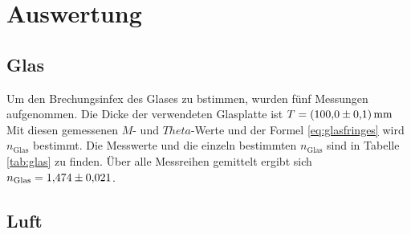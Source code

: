 \section{Auswertung}
\label{sec:Auswertung}
\subsection{Glas}
Um den Brechungsinfex des Glases zu bstimmen, wurden fünf Messungen aufgenommen. Die Dicke der verwendeten Glasplatte ist $T=\SI{100\pm 0.1}{\milli\meter}$
Mit diesen gemessenen $M$- und $Theta$-Werte und der Formel \eqref{eq:glasfringes} wird $n_\text{Glas}$ bestimmt. Die Messwerte und die einzeln bestimmten
 $n_\text{Glas}$ sind in Tabelle \ref{tab:glas} zu finden.
Über alle Messreihen gemittelt ergibt sich $n_\text{Glas}=\num{1.474\pm 0.021}$.

\subsection{Luft}
